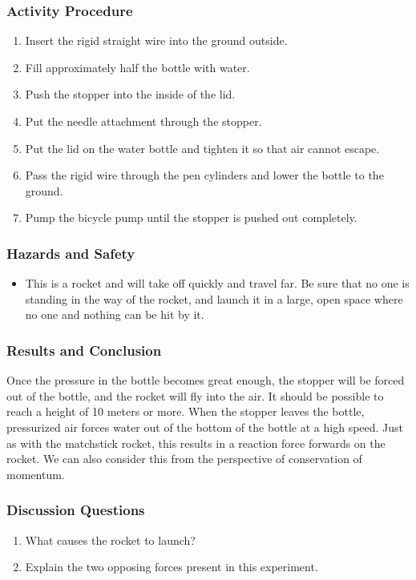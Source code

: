 \subsubsection*{Activity Procedure}
\begin{enumerate}
\item{Insert the rigid straight wire into the ground outside.}
\item{Fill approximately half the bottle with water.}
\item{Push the stopper into the inside of the lid.}
\item{Put the needle attachment through the stopper.}
\item{Put the lid on the water bottle and tighten it so that air cannot escape.}
\item{Pass the rigid wire through the pen cylinders and lower the bottle to the ground.}\item{Pump the bicycle pump until the stopper is pushed out completely.}
\end{enumerate}

\subsubsection*{Hazards and Safety}
\begin{itemize}
\item{This is a rocket and will take off quickly and travel far.  Be sure that no one is standing in the way of the rocket, and launch it in a large, open space where no one and nothing can be hit by it.}
\end{itemize}

\subsubsection*{Results and Conclusion}
Once the pressure in the bottle becomes great enough, the stopper will be forced out of the bottle, and the rocket will fly into the air. It should be possible to reach a height of 10 meters or more.  When the stopper leaves the bottle, pressurized air forces water out of the bottom of the bottle at a high speed. Just as with the matchstick rocket, this results in a reaction force forwards on the rocket.
We can also consider this from the perspective of conservation of momentum.


\subsubsection*{Discussion Questions}
\begin{enumerate}
\item{What causes the rocket to launch?}
\item{Explain the two opposing forces present in this experiment.}
\end{enumerate}

